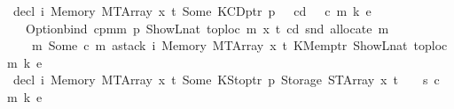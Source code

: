 \begin{isabellebody}
{\isacharbar}{\kern0pt}\ {\isachardoublequoteopen}decl\ i\ {\isacharparenleft}{\kern0pt}Memory\ {\isacharparenleft}{\kern0pt}MTArray\ x\ t{\isacharparenright}{\kern0pt}{\isacharparenright}{\kern0pt}\ {\isacharparenleft}{\kern0pt}Some\ {\isacharparenleft}{\kern0pt}KCDptr\ p{\isacharcomma}{\kern0pt}\ {\isacharunderscore}{\kern0pt}{\isacharparenright}{\kern0pt}{\isacharparenright}{\kern0pt}\ {\isacharunderscore}{\kern0pt}\ cd\ {\isacharunderscore}{\kern0pt}\ {\isacharunderscore}{\kern0pt}\ {\isacharparenleft}{\kern0pt}c{\isacharcomma}{\kern0pt}\ m{\isacharcomma}{\kern0pt}\ k{\isacharcomma}{\kern0pt}\ e{\isacharparenright}{\kern0pt}\ {\isacharequal}{\kern0pt}\isanewline
\ \ \ Option{\isachardot}{\kern0pt}bind\ {\isacharparenleft}{\kern0pt}cpm{}m\ p\ {\isacharparenleft}{\kern0pt}ShowL\isactrlsub n\isactrlsub a\isactrlsub t\ {\isacharparenleft}{\kern0pt}toploc\ m{\isacharparenright}{\kern0pt}{\isacharparenright}{\kern0pt}\ x\ t\ cd\ {\isacharparenleft}{\kern0pt}snd\ {\isacharparenleft}{\kern0pt}allocate\ m{\isacharparenright}{\kern0pt}{\isacharparenright}{\kern0pt}{\isacharparenright}{\kern0pt}\isanewline
\ \ \ \ {\isacharparenleft}{\kern0pt}{\isasymlambda}m{\isacharprime}{\kern0pt}{\isachardot}{\kern0pt}\ Some\ {\isacharparenleft}{\kern0pt}c{\isacharcomma}{\kern0pt}\ m{\isacharprime}{\kern0pt}{\isacharcomma}{\kern0pt}\ astack\ i\ {\isacharparenleft}{\kern0pt}Memory\ {\isacharparenleft}{\kern0pt}MTArray\ x\ t{\isacharparenright}{\kern0pt}{\isacharparenright}{\kern0pt}\ {\isacharparenleft}{\kern0pt}KMemptr\ {\isacharparenleft}{\kern0pt}ShowL\isactrlsub n\isactrlsub a\isactrlsub t\ {\isacharparenleft}{\kern0pt}toploc\ m{\isacharparenright}{\kern0pt}{\isacharparenright}{\kern0pt}{\isacharparenright}{\kern0pt}\ {\isacharparenleft}{\kern0pt}k{\isacharcomma}{\kern0pt}\ e{\isacharparenright}{\kern0pt}{\isacharparenright}{\kern0pt}{\isacharparenright}{\kern0pt}{\isachardoublequoteclose}\isanewline
{\isacharbar}{\kern0pt}\ {\isachardoublequoteopen}decl\ i\ {\isacharparenleft}{\kern0pt}Memory\ {\isacharparenleft}{\kern0pt}MTArray\ x\ t{\isacharparenright}{\kern0pt}{\isacharparenright}{\kern0pt}\ {\isacharparenleft}{\kern0pt}Some\ {\isacharparenleft}{\kern0pt}KStoptr\ p{\isacharcomma}{\kern0pt}\ Storage\ {\isacharparenleft}{\kern0pt}STArray\ x{\isacharprime}{\kern0pt}\ t{\isacharprime}{\kern0pt}{\isacharparenright}{\kern0pt}{\isacharparenright}{\kern0pt}{\isacharparenright}{\kern0pt}\ {\isacharunderscore}{\kern0pt}\ {\isacharunderscore}{\kern0pt}\ {\isacharunderscore}{\kern0pt}\ s\ {\isacharparenleft}{\kern0pt}c{\isacharcomma}{\kern0pt}\ m{\isacharcomma}{\kern0pt}\ k{\isacharcomma}{\kern0pt}\ e{\isacharparenright}{\kern0pt}\ {\isacharequal}{\kern0pt}\isanewline

\end{isabellebody}
